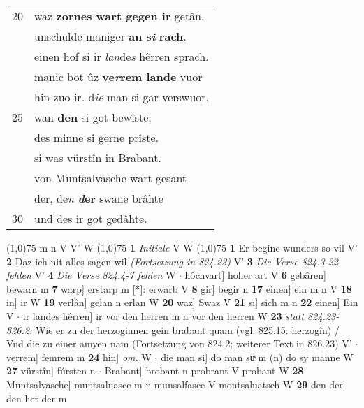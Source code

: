 \documentclass[8pt,a4paper,notitlepage]{article}
\begin{document}
\begin{table}[ht]
\begin{minipage}[t]{0.5\linewidth}
\begin{tabular}{rl}
20 & waz \textbf{zornes wart gegen ir} getân,\\ 
 & unschulde maniger \textbf{an s\textit{i}} \textbf{rach}.\\ 
 & einen hof si ir \textit{lan}de\textit{s} hêrren sprach.\\ 
 & manic bot ûz \textbf{ve\textit{r}rem lande} vuor\\ 
 & hin zuo ir. d\textit{ie} man si gar verswuor,\\ 
25 & wan \textbf{den} si got bewîste;\\ 
 & des minne si gerne prîste.\\ 
 & si was vürstîn in Brabant.\\ 
 & von Muntsalvasche wart gesant\\ 
 & der, de\textit{n} \textbf{\textit{d}er} swane brâhte\\ 
30 & und des ir got gedâhte.\\ 
\end{tabular}
\scriptsize
\line(1,0){75} \newline
m n V V' W \newline
\line(1,0){75} \newline
\textbf{1} \textit{Initiale} V W  \newline
\line(1,0){75} \newline
\textbf{1} Er beginc wunders so vil V' \textbf{2} Daz ich nit alles sagen wil \textit{(Fortsetzung in 824.23)} V' \textbf{3} \textit{Die Verse 824.3-22 fehlen} V'  \textbf{4} \textit{Die Verse 824.4-7 fehlen} W   $\cdot$ hôchvart] hoher art V \textbf{6} gebâren] bewarn m \textbf{7} warp] erstarp m [*]: erwarb V \textbf{8} gir] begir n \textbf{17} einen] ein m n V \textbf{18} in] ir W \textbf{19} verlân] gelan n erlan W \textbf{20} waz] Swaz V \textbf{21} si] sich m n \textbf{22} einen] Ein V  $\cdot$ ir landes hêrren] ir vor den herren m n vor den herren W \textbf{23} \textit{statt 824.23-826.2:} Wie er zu der herzoginnen gein brabant quam (vgl. 825.15: herzogîn) / Vnd die zu einer amyen nam (Fortsetzung von 824.2; weiterer Text in 826.23) V'   $\cdot$ verrem] femrem m \textbf{24} hin] \textit{om.} W  $\cdot$ die man si] do man suͯ m (n) do sy manne W \textbf{27} vürstîn] fúrsten n  $\cdot$ Brabant] brobant n probrant V probant W \textbf{28} Muntsalvasche] muntsaluasce m n munsalfasce V montsaluatsch W \textbf{29} den der] den het der m \newline
\end{minipage}
\end{table}
\newpage
\end{document}
